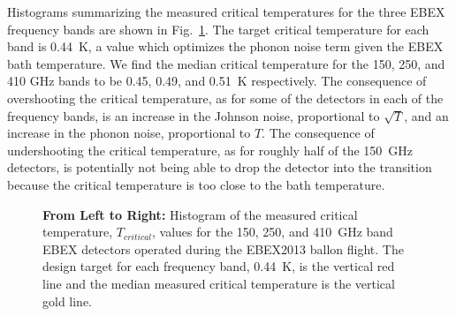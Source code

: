 Histograms summarizing the measured critical temperatures for the three \ac{EBEX} frequency bands are shown in Fig.~\ref{fig:tc_histograms}. 
The target critical temperature for each band is 0.44~K, a value which optimizes the phonon noise term given the \ac{EBEX} bath temperature. %
We find the median critical temperature for the 150, 250, and 410 GHz bands to be 0.45, 0.49, and 0.51~K respectively.  
The consequence of overshooting the critical temperature, as for some of the detectors in each of the frequency bands, is an increase in the Johnson noise, proportional to $\sqrt{T}$, and an increase in the phonon noise, proportional to $T$. 
The consequence of undershooting the critical temperature, as for roughly half of the 150~GHz detectors, is potentially not being able to drop the detector into the transition because the critical temperature is too close to the bath temperature. %

\begin{figure}[ht!]
\centering
{}
\caption{\textbf{From Left to Right:} Histogram of the measured critical temperature, $T_{critical}$, values for the 150, 250, and 410~GHz band \ac{EBEX} detectors operated during the \ac{EBEX2013} ballon flight. The design target for each frequency band, 0.44~K, is the vertical red line and the median measured critical temperature is the vertical gold line. }
\label{fig:tc_histograms}
\end{figure}

